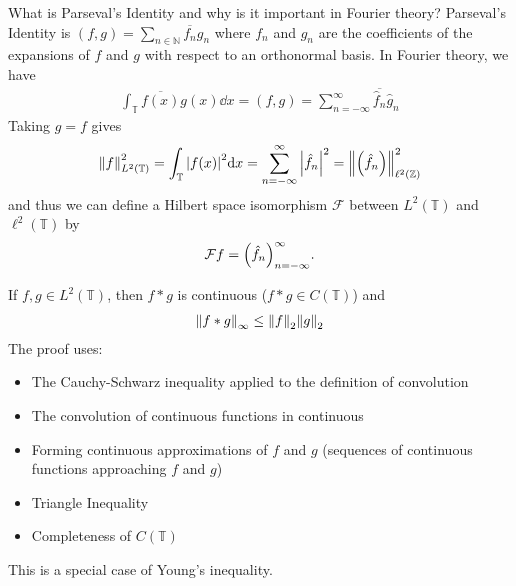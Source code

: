 \documentclass[avery5388,grid,frame]{flashcards}
\def\torus{\mathbb{T}}
\begin{document}
\begin{flashcard}
    {What is Parseval's Identity and why is it important in Fourier theory?}
    Parseval's Identity is $(f,g) = \sum_{n\in\mathbb{N}} \overline{f_n}g_n$ where $f_n$ and $g_n$ are the coefficients of the expansions of $f$ and $g$ with respect to an orthonormal basis.  In Fourier theory, we have
    \vspace{-5pt}
    \begin{align*}
        \int_\torus \overline{f(x)}g(x)\dd x = (f,g) = \sum_{n=-\infty}^\infty \overline{\hat{f}_n}\hat{g}_n
    \end{align*}
    \vspace{-5pt}
    Taking $g = f$ gives
    \vspace{-5pt}
    \begin{align*}
        \norm{f}_{L^2(\torus)}^2 = \int_\torus \abs{f(x)}^2\dd x = \sum_{n=-\infty}^\infty \abs{\hat{f}_n}^2 = \norm{\qty(\hat{f}_n)}_{\ell^2(\mathbb{Z})}^2
    \end{align*}
    and thus we can define a Hilbert space isomorphism $\mathcal{F}$ between $L^2(\torus)$ and $\ell^2(\torus)$ by
    \begin{align*}
        \mathcal{F}f = \qty(\hat{f}_n)_{n=-\infty}^\infty.
    \end{align*}
\end{flashcard}

\begin{flashcard}
    {If $f,g \in L^2(\torus)$, then $f*g$ is continuous ($f*g \in C(\torus)$) and
    \begin{align*}
        \norm{f * g}_\infty \leq \norm{f}_2\norm{g}_2
    \end{align*}}
    The proof uses:
    \begin{itemize}
        \item The Cauchy-Schwarz inequality applied to the definition of convolution
        \item The convolution of continuous functions in continuous
        \item Forming continuous approximations of $f$ and $g$ (sequences of continuous functions approaching $f$ and $g$)
        \item Triangle Inequality
        \item Completeness of $C(\torus)$
    \end{itemize}
    This is a special case of Young's inequality.
\end{flashcard}
\end{document}
